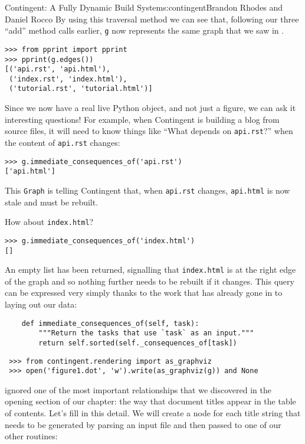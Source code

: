 \begin{aosachapter}{Contingent: A Fully Dynamic Build System}{s:contingent}{Brandon Rhodes and Daniel Rocco}
By using this traversal method we can see that, following our three
``add'' method calls earlier, \texttt{g} now represents the same graph
that we saw in .

\begin{verbatim}
>>> from pprint import pprint
>>> pprint(g.edges())
[('api.rst', 'api.html'),
 ('index.rst', 'index.html'),
 ('tutorial.rst', 'tutorial.html')]
\end{verbatim}

Since we now have a real live Python object, and not just a figure, we
can ask it interesting questions! For example, when Contingent is
building a blog from source files, it will need to know things like
``What depends on \texttt{api.rst}?'' when the content of
\texttt{api.rst} changes:

\begin{verbatim}
>>> g.immediate_consequences_of('api.rst')
['api.html']
\end{verbatim}

This \texttt{Graph} is telling Contingent that, when \texttt{api.rst}
changes, \texttt{api.html} is now stale and must be rebuilt.

How about \texttt{index.html}?

\begin{verbatim}
>>> g.immediate_consequences_of('index.html')
[]
\end{verbatim}

An empty list has been returned, signalling that \texttt{index.html} is
at the right edge of the graph and so nothing further needs to be
rebuilt if it changes. This query can be expressed very simply thanks to
the work that has already gone in to laying out our data:

\begin{verbatim}
    def immediate_consequences_of(self, task):
        """Return the tasks that use `task` as an input."""
        return self.sorted(self._consequences_of[task])
\end{verbatim}

\begin{verbatim}
 >>> from contingent.rendering import as_graphviz
 >>> open('figure1.dot', 'w').write(as_graphviz(g)) and None
\end{verbatim}

 ignored one of the most important
relationships that we discovered in the opening section of our chapter:
the way that document titles appear in the table of contents. Let's fill
in this detail. We will create a node for each title string that needs
to be generated by parsing an input file and then passed to one of our
other routines:


\end{aosachapter}
